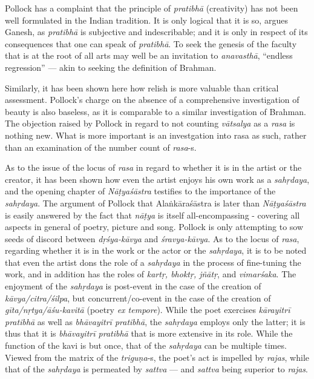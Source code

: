 Pollock has a complaint that the principle of \textsl{pratibhā} (creativity) has not been well formulated  in the Indian tradition. It is only logical that it is so, argues Ganesh, as \textsl{pratibhā} is subjective and indescribable; and it is only in respect of its consequences that one can speak of \textsl{pratibhā}. To seek the genesis of the faculty that is at the root of all arts may well be an invitation to \textsl{anavasthā}, “endless regression” --- akin to seeking the definition of Brahman. 

Similarly, it has been shown here how relish is more valuable than critical assessment. Pollock’s charge on the absence of a comprehensive investigation of beauty is also baseless, as it is comparable to a similar investigation of Brahman. The objection raised by Pollock in regard to not counting \textsl{vātsalya} as a \textsl{rasa} is nothing new. What is more important is an investgation into rasa as such, rather than an examination of the number count of \textsl{rasa}-s.

As to the issue of the locus of \textsl{rasa} in regard to whether it is in the artist or the creator, it has been shown how even the artist enjoys his own work as a \textsl{sahṛdaya}, and the opening chapter of \textsl{Nāṭyaśāstra} testifies to the importance of the \textsl{sahṛdaya}. The argument of Pollock that Alaṅkāraśāstra is later than \textsl{Nāṭyaśāstra} is easily answered by the fact that \textsl{nāṭya} is itself all-encompassing - covering all aspects in general of poetry, picture and song. Pollock is only attempting to sow seeds of discord between \textsl{dṛśya-kāvya} and \textsl{śravya-kāvya}. As to the locus of \textsl{rasa}, regarding whether it is in the work or the actor or the \textsl{sahṛdaya}, it is to be noted that even the artist dons the role of a \textsl{sahṛdaya} in the process of fine-tuning the work, and in addition has the roles of \textsl{kartṛ, bhoktṛ, jñātṛ}, and \textsl{vimarśaka}. The enjoyment of the \textsl{sahṛdaya} is post-event in the case of the creation of \textsl{kāvya/citra/śilpa}, but concurrent/co-event in the case of the creation of \textsl{gīta/nṛtya/āśu-kavitā} (poetry \textsl{ex tempore}). While the poet exercises \textsl{kārayitrī pratibhā} as well as \textsl{bhāvayitrī pratibhā}, the \textsl{sahṛdaya} employs only the latter; it is thus that it is \textsl{bhāvayitrī pratibhā} that is more extensive in its role. While the function of the kavi is but once, that of the \textsl{sahṛdaya} can be multiple times. Viewed from the matrix of the \textsl{triguṇa}-s, the poet's act is impelled by \textsl{rajas}, while that of the \textsl{sahṛdaya} is permeated by \textsl{sattva} --- and \textsl{sattva} being superior to \textsl{rajas}.

